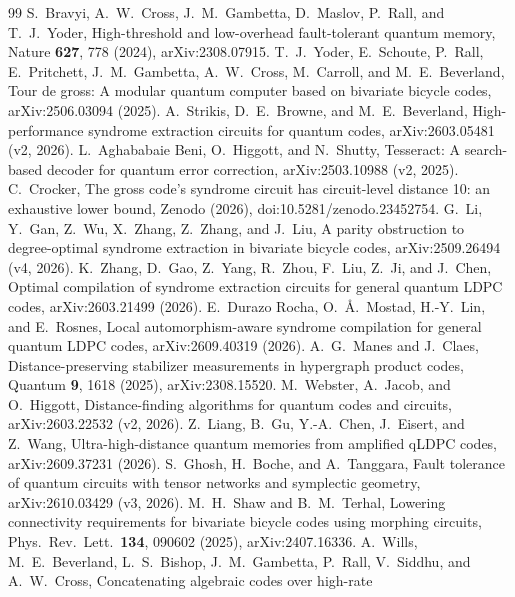 \documentclass[aps,prl,twocolumn,superscriptaddress,nofootinbib]{revtex4-2}
\begin{document}
\begin{thebibliography}{99}
 S.~Bravyi, A.~W.~Cross, J.~M.~Gambetta, D.~Maslov, P.~Rall, and
T.~J.~Yoder, High-threshold and low-overhead fault-tolerant quantum memory,
Nature \textbf{627}, 778 (2024), arXiv:2308.07915.
 T.~J.~Yoder, E.~Schoute, P.~Rall, E.~Pritchett,
J.~M.~Gambetta, A.~W.~Cross, M.~Carroll, and M.~E.~Beverland, Tour de gross: A
modular quantum computer based on bivariate bicycle codes, arXiv:2506.03094 (2025).
 A.~Strikis, D.~E.~Browne, and M.~E.~Beverland,
High-performance syndrome extraction circuits for quantum codes,
arXiv:2603.05481 (v2, 2026).
 L.~Aghababaie Beni, O.~Higgott, and N.~Shutty, Tesseract: A
search-based decoder for quantum error correction, arXiv:2503.10988 (v2, 2025).
 C.~Crocker, The gross code's syndrome circuit has circuit-level
distance 10: an exhaustive lower bound, Zenodo (2026), doi:10.5281/zenodo.23452754.
 G.~Li, Y.~Gan, Z.~Wu, X.~Zhang, Z.~Zhang, and J.~Liu, A parity
obstruction to degree-optimal syndrome extraction in bivariate bicycle codes,
arXiv:2509.26494 (v4, 2026).
 K.~Zhang, D.~Gao, Z.~Yang, R.~Zhou, F.~Liu, Z.~Ji, and J.~Chen,
Optimal compilation of syndrome extraction circuits for general quantum LDPC codes,
arXiv:2603.21499 (2026).
 E.~Durazo Rocha, O.~\AA.~Mostad, H.-Y.~Lin, and E.~Rosnes,
Local automorphism-aware syndrome compilation for general quantum LDPC codes,
arXiv:2609.40319 (2026).
 A.~G.~Manes and J.~Claes, Distance-preserving stabilizer
measurements in hypergraph product codes, Quantum \textbf{9}, 1618 (2025),
arXiv:2308.15520.
 M.~Webster, A.~Jacob, and O.~Higgott, Distance-finding
algorithms for quantum codes and circuits, arXiv:2603.22532 (v2, 2026).
 Z.~Liang, B.~Gu, Y.-A.~Chen, J.~Eisert, and Z.~Wang,
Ultra-high-distance quantum memories from amplified qLDPC codes,
arXiv:2609.37231 (2026).
 S.~Ghosh, H.~Boche, and A.~Tanggara, Fault tolerance of quantum
circuits with tensor networks and symplectic geometry, arXiv:2610.03429 (v3, 2026).
 M.~H.~Shaw and B.~M.~Terhal, Lowering connectivity
requirements for bivariate bicycle codes using morphing circuits, Phys.\ Rev.\
Lett.\ \textbf{134}, 090602 (2025), arXiv:2407.16336.
 A.~Wills, M.~E.~Beverland, L.~S.~Bishop, J.~M.~Gambetta,
P.~Rall, V.~Siddhu, and A.~W.~Cross, Concatenating algebraic codes over high-rate

\end{thebibliography}
\end{document}

